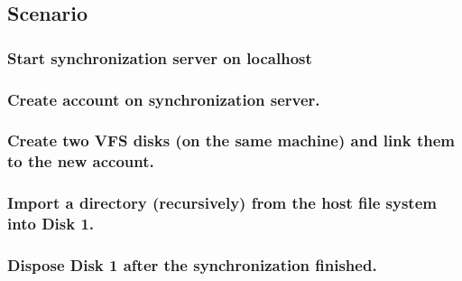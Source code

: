 \documentclass[JCDReport.tex]{subfiles}
\begin{document}
\subsection{Scenario}


\subsubsection{Start synchronization server on localhost}


\subsubsection{Create account on synchronization server.}

\subsubsection{Create two VFS disks (on the same machine) and link them to the new account.}

\subsubsection{Import a directory (recursively) from the host file system into Disk 1.}

\subsubsection{Dispose Disk 1 after the synchronization finished.}
\end{document}
